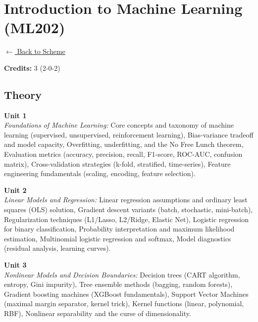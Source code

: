\section*{Introduction to Machine Learning (ML202)}
\label{major:ML_2}

\noindent \small{\hyperref[main:scheme]{$\leftarrow$ Back to Scheme}} \vspace{0.5cm}

\noindent \textbf{Credits:} 3 (2-0-2)

\subsection*{Theory}
\noindent\textbf{Unit 1} \\
\textit{Foundations of Machine Learning:} Core concepts and taxonomy of machine learning (supervised, unsupervised, reinforcement learning), Bias-variance tradeoff and model capacity, Overfitting, underfitting, and the No Free Lunch theorem, Evaluation metrics (accuracy, precision, recall, F1-score, ROC-AUC, confusion matrix), Cross-validation strategies (k-fold, stratified, time-series), Feature engineering fundamentals (scaling, encoding, feature selection).

\vspace{0.3cm}

\noindent\textbf{Unit 2} \\
\textit{Linear Models and Regression:} Linear regression assumptions and ordinary least squares (OLS) solution, Gradient descent variants (batch, stochastic, mini-batch), Regularization techniques (L1/Lasso, L2/Ridge, Elastic Net), Logistic regression for binary classification, Probability interpretation and maximum likelihood estimation, Multinomial logistic regression and softmax, Model diagnostics (residual analysis, learning curves).

\vspace{0.3cm}

\noindent\textbf{Unit 3} \\
\textit{Nonlinear Models and Decision Boundaries:} Decision trees (CART algorithm, entropy, Gini impurity), Tree ensemble methods (bagging, random forests), Gradient boosting machines (XGBoost fundamentals), Support Vector Machines (maximal margin separator, kernel trick), Kernel functions (linear, polynomial, RBF), Nonlinear separability and the curse of dimensionality.

\vspace{0.3cm}

